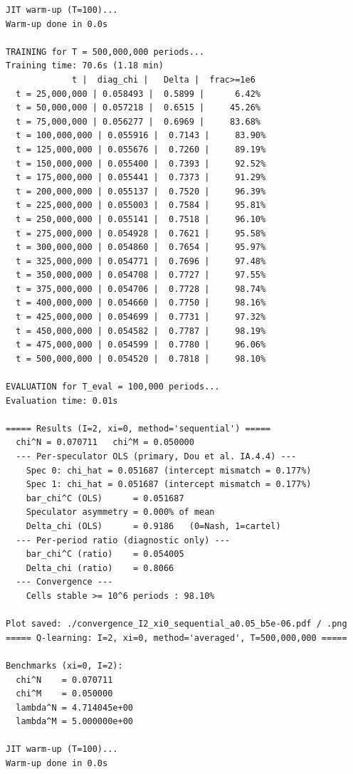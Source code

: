 \begin{lstlisting}[style=outputstyle]
JIT warm-up (T=100)...
Warm-up done in 0.0s

TRAINING for T = 500,000,000 periods...
Training time: 70.6s (1.18 min)
             t |  diag_chi |   Delta |  frac>=1e6
  t = 25,000,000 | 0.058493 |  0.5899 |      6.42%
  t = 50,000,000 | 0.057218 |  0.6515 |     45.26%
  t = 75,000,000 | 0.056277 |  0.6969 |     83.68%
  t = 100,000,000 | 0.055916 |  0.7143 |     83.90%
  t = 125,000,000 | 0.055676 |  0.7260 |     89.19%
  t = 150,000,000 | 0.055400 |  0.7393 |     92.52%
  t = 175,000,000 | 0.055441 |  0.7373 |     91.29%
  t = 200,000,000 | 0.055137 |  0.7520 |     96.39%
  t = 225,000,000 | 0.055003 |  0.7584 |     95.81%
  t = 250,000,000 | 0.055141 |  0.7518 |     96.10%
  t = 275,000,000 | 0.054928 |  0.7621 |     95.58%
  t = 300,000,000 | 0.054860 |  0.7654 |     95.97%
  t = 325,000,000 | 0.054771 |  0.7696 |     97.48%
  t = 350,000,000 | 0.054708 |  0.7727 |     97.55%
  t = 375,000,000 | 0.054706 |  0.7728 |     98.74%
  t = 400,000,000 | 0.054660 |  0.7750 |     98.16%
  t = 425,000,000 | 0.054699 |  0.7731 |     97.32%
  t = 450,000,000 | 0.054582 |  0.7787 |     98.19%
  t = 475,000,000 | 0.054599 |  0.7780 |     96.06%
  t = 500,000,000 | 0.054520 |  0.7818 |     98.10%

EVALUATION for T_eval = 100,000 periods...
Evaluation time: 0.01s

===== Results (I=2, xi=0, method='sequential') =====
  chi^N = 0.070711   chi^M = 0.050000
  --- Per-speculator OLS (primary, Dou et al. IA.4.4) ---
    Spec 0: chi_hat = 0.051687 (intercept mismatch = 0.177%)
    Spec 1: chi_hat = 0.051687 (intercept mismatch = 0.177%)
    bar_chi^C (OLS)      = 0.051687
    Speculator asymmetry = 0.000% of mean
    Delta_chi (OLS)      = 0.9186   (0=Nash, 1=cartel)
  --- Per-period ratio (diagnostic only) ---
    bar_chi^C (ratio)    = 0.054005
    Delta_chi (ratio)    = 0.8066
  --- Convergence ---
    Cells stable >= 10^6 periods : 98.10%

Plot saved: ./convergence_I2_xi0_sequential_a0.05_b5e-06.pdf / .png
===== Q-learning: I=2, xi=0, method='averaged', T=500,000,000 =====

Benchmarks (xi=0, I=2):
  chi^N    = 0.070711
  chi^M    = 0.050000
  lambda^N = 4.714045e+00
  lambda^M = 5.000000e+00

JIT warm-up (T=100)...
Warm-up done in 0.0s


\end{lstlisting}
